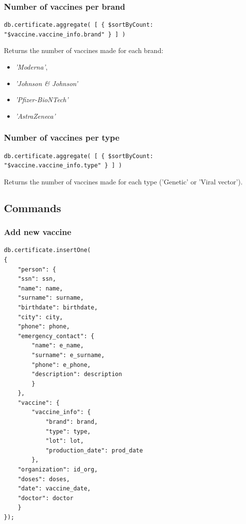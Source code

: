\documentclass[12pt, a4paper]{article}
\begin{document}
\subsubsection{Number of vaccines per brand}
\begin{tcolorbox}[fontupper=\scriptsize]
    \begin{verbatim}
db.certificate.aggregate( [ { $sortByCount: "$vaccine.vaccine_info.brand" } ] )
    \end{verbatim}
\end{tcolorbox}

\noindent
Returns the number of vaccines made for each brand:
\begin{itemize}
    \item \emph{'Moderna'},
    \item \emph{'Johnson \& Johnson'}
    \item \emph{'Pfizer-BioNTech'}
    \item \emph{'AstraZeneca'}
\end{itemize}

\subsubsection{Number of vaccines per type}
\begin{tcolorbox}[fontupper=\scriptsize]
    \begin{verbatim}
db.certificate.aggregate( [ { $sortByCount: "$vaccine.vaccine_info.type" } ] )
    \end{verbatim}
\end{tcolorbox}

\noindent
Returns the number of vaccines made for each type ('Genetic' or 'Viral vector').

\subsection{Commands}

\subsubsection{Add new vaccine} 
\begin{tcolorbox}[fontupper=\scriptsize]
    \begin{verbatim}
db.certificate.insertOne(
{ 
    "person": {
    "ssn": ssn,
    "name": name,
    "surname": surname,
    "birthdate": birthdate,
    "city": city,
    "phone": phone,
    "emergency_contact": {
        "name": e_name,
        "surname": e_surname,
        "phone": e_phone,
        "description": description
        }
    },
    "vaccine": {
        "vaccine_info": {
            "brand": brand,
            "type": type,
            "lot": lot,
            "production_date": prod_date
        },
    "organization": id_org,
    "doses": doses,
    "date": vaccine_date,
    "doctor": doctor
    }
});
    \end{verbatim}
\end{tcolorbox}
\end{document}
